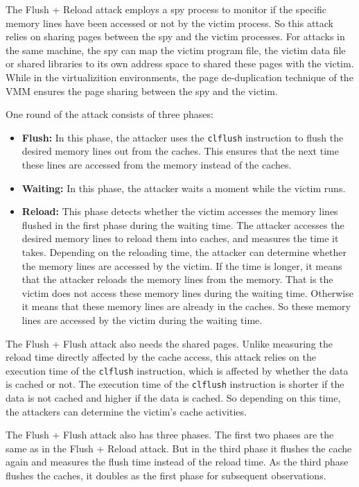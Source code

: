 The Flush + Reload attack \cite{flushreload} employs a spy process to monitor if the specific memory lines have been accessed or not by the victim process.
So this attack relies on sharing pages between the spy and the victim processes.
For attacks in the same machine, the spy can map the victim program file, the victim data file or shared libraries to its own address space to shared these pages with the victim.
While in the virtualizition environments, the page de-duplication technique of the VMM ensures the page sharing between the spy and the victim.

One round of the attack consists of three phases:
\begin{itemize}
  \item
    \textbf{Flush:}
    In this phase, the attacker uses the \verb+clflush+ instruction to flush the desired memory lines out from the caches.
    This ensures that the next time these lines are accessed from the memory instead of the caches.
  \item
    \textbf{Waiting:}
    In this phase, the attacker waits a moment while the victim runs.
  \item
    \textbf{Reload:}
    This phase detects whether the victim accesses the memory lines flushed in the first phase during the waiting time.
    The attacker accesses the desired memory lines to reload them into caches, and measures the time it takes.
    Depending on the reloading time, the attacker can determine whether the memory lines are accessed by the victim.
    If the time is longer, it means that the attacker reloads the memory lines from the memory.
    That is the victim does not access these memory lines during the waiting time.
    Otherwise it means that these memory lines are already in the caches.
    So these memory lines are accessed by the victim during the waiting time.%
\end{itemize}

The Flush + Flush attack \cite{gruss2016flush} also needs the shared pages.
Unlike measuring the reload time directly affected by the cache access,
 this attack relies on the execution time of the \verb+clflush+ instruction,
  which is affected by whether the data is cached or not.
The execution time of the \verb+clflush+ instruction is shorter if the data is not cached
 and higher if the data is cached.
So depending on this time, the attackers can determine the victim's cache activities.

The Flush + Flush attack also has three phases.
The first two phases are the same as in the Flush + Reload attack.
But in the third phase it flushes the cache again and measures the flush time instead of the reload time.
As the third phase flushes the caches, it doubles as the first phase for subsequent observations.

